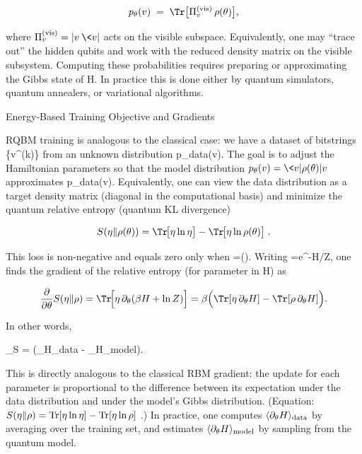 \[

p_\theta(v) \;=\; \Tr\bigl[\Pi_v^{(\text{vis})}\,\rho(\theta)\bigr],

\]

where \(\Pi_v^{(\text{vis})}=|v\>\<v|\) acts on the visible subspace.  Equivalently, one may “trace out” the hidden qubits and work with the reduced density matrix on the visible subsystem.  Computing these probabilities requires preparing or approximating the Gibbs state of H.  In practice this is done either by quantum simulators, quantum annealers, or variational algorithms.





Energy-Based Training Objective and Gradients





RQBM training is analogous to the classical case: we have a dataset of bitstrings \{v^{(k)}\} from an unknown distribution p_{\rm data}(v).  The goal is to adjust the Hamiltonian parameters \theta so that the model distribution \(p_\theta(v)=\<v|\rho(\theta)|v\>\) approximates p_{\rm data}(v).  Equivalently, one can view the data distribution as a target density matrix \eta (diagonal in the computational basis) and minimize the quantum relative entropy (quantum KL divergence)

\[

S(\eta\Vert \rho(\theta)) = \Tr\!\bigl[\eta\ln\eta\bigr] - \Tr\!\bigl[\eta\ln\rho(\theta)\bigr] \;.

\]

This loss is non-negative and equals zero only when \eta=\rho(\theta).  Writing \rho=e^{-H}/Z, one finds the gradient of the relative entropy (for parameter \theta in H) as

\[

\frac{\partial}{\partial\theta} S(\eta\Vert\rho)

= \Tr\!\Bigl[\eta\,\partial_\theta(\beta H + \ln Z)\Bigr]

= \beta\Bigl(\Tr[\eta\,\partial_\theta H] - \Tr[\rho\,\partial_\theta H]\Bigr).

\]

In other words,

\nabla_\theta S \;=\; \beta\Bigl(\langle \partial_\theta H\rangle_{\rm data} \;-\; \langle \partial_\theta H\rangle_{\rm model}\Bigr).

This is directly analogous to the classical RBM gradient: the update for each parameter is proportional to the difference between its expectation under the data distribution and under the model’s Gibbs distribution.  (Equation: $S(\eta\Vert\rho)={\rm Tr}[\eta\ln\eta]-{\rm Tr}[\eta\ln\rho]$ .)  In practice, one computes $\langle \partial_\theta H\rangle_{\rm data}$ by averaging over the training set, and estimates $\langle \partial_\theta H\rangle_{\rm model}$ by sampling from the quantum model.



